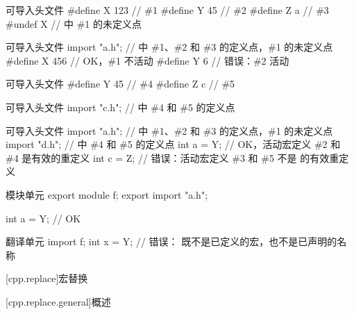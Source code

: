     \pnum
    \begin{example}
    \begin{codeblocktu}{可导入头文件 }
    #define X 123   // \#1
    #define Y 45    // \#2
    #define Z a     // \#3
    #undef X        //  中 \#1 的未定义点
    \end{codeblocktu}
    
    \begin{codeblocktu}{可导入头文件 }
    import "a.h";   //  中 \#1、\#2 和 \#3 的定义点，\#1 的未定义点
    #define X 456   // OK，\#1 不活动
    #define Y 6     // 错误：\#2 活动
    \end{codeblocktu}
    
    \begin{codeblocktu}{可导入头文件 }
    #define Y 45    // \#4
    #define Z c     // \#5
    \end{codeblocktu}
    
    \begin{codeblocktu}{可导入头文件 }
    import "c.h";   //  中 \#4 和 \#5 的定义点
    \end{codeblocktu}
    
    \begin{codeblocktu}{可导入头文件 }
    import "a.h";   //  中 \#1、\#2 和 \#3 的定义点，\#1 的未定义点
    import "d.h";   //  中 \#4 和 \#5 的定义点
    int a = Y;      // OK，活动宏定义 \#2 和 \#4 是有效的重定义
    int c = Z;      // 错误：活动宏定义 \#3 和 \#5 不是  的有效重定义
    \end{codeblocktu}
    
    \begin{codeblocktu}{模块单元 }
    export module f;
    export import "a.h";
    
    int a = Y;      // OK
    \end{codeblocktu}
    
    \begin{codeblocktu}{翻译单元 }
    import f;
    int x = Y;      // 错误： 既不是已定义的宏，也不是已声明的名称
    \end{codeblocktu}
    \end{example}
    
    [cpp.replace]{宏替换}%
    
    [cpp.replace.general]{概述}%
    

